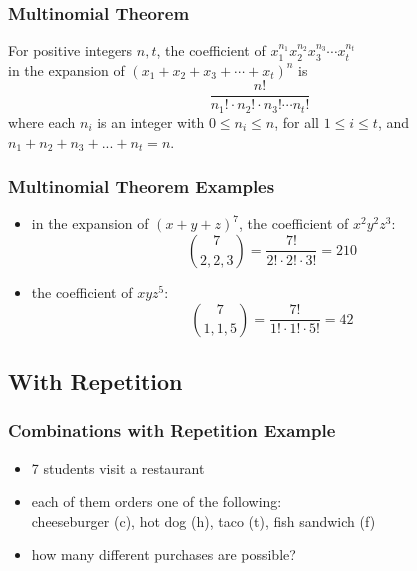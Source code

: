 \documentclass[dvipsnames]{beamer}
\begin{document}
\begin{frame}
  \frametitle{Multinomial Theorem}

  \begin{theorem}
    For positive integers $n, t$, the coefficient of
    $x_{1}^{n_1} x_{2}^{n_2} x_{3}^{n_3} \cdots x_{t}^{n_t}$\\
    in the expansion of $(x_1 + x_2 + x_3 + \cdots + x_t)^n$ is
    \begin{equation*}
      \frac{n!}{n_1! \cdot n_2! \cdot n_3! \cdots n_t!}
    \end{equation*}
    where each $n_i$ is an integer with $0 \leq n_i \leq n$,
    for all $1 \leq i \leq t$, and\\
    $n_1 + n_2 + n_3 + ... + n_t = n$.
  \end{theorem}
\end{frame}

\begin{frame}
  \frametitle{Multinomial Theorem Examples}

  \begin{itemize}
    \item in the expansion of $(x+y+z)^7$, the coefficient of $x^2 y^2 z^3$:
    \begin{equation*}
      {7 \choose 2,2,3} = \frac{7!}{2! \cdot 2! \cdot 3!} = 210
    \end{equation*}
  \end{itemize}
  \begin{itemize}
    \item the coefficient of $x y z^5$:
    \begin{equation*}
      {7 \choose 1,1,5} = \frac{7!}{1! \cdot 1! \cdot 5!} = 42
    \end{equation*}
  \end{itemize}
\end{frame}

\subsection{With Repetition}

\begin{frame}
  \frametitle{Combinations with Repetition Example}

  \begin{itemize}
    \item 7 students visit a restaurant
    \item each of them orders one of the following:\\
      cheeseburger (c), hot dog (h), taco (t), fish sandwich (f)
    \item how many different purchases are possible?
  \end{itemize}
\end{frame}
\end{document}
